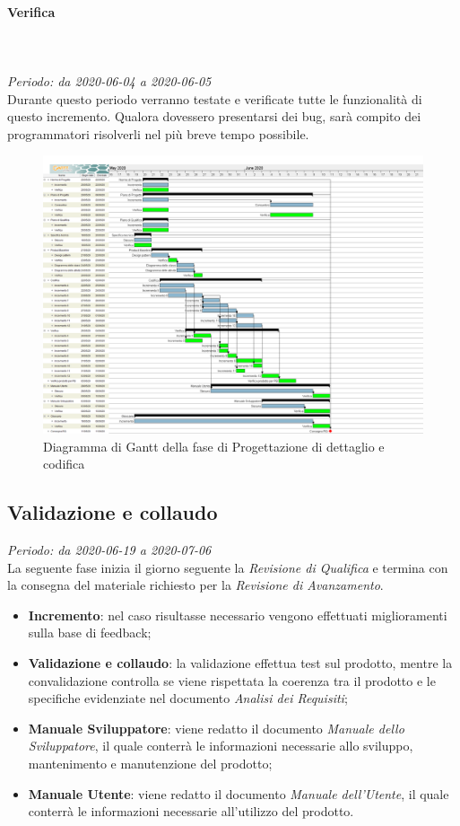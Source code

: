 \paragraph*{Verifica}\mbox{} \\ \mbox{} \\ 
\textit{Periodo: da 2020-06-04 a 2020-06-05}\\
Durante questo periodo verranno testate e verificate tutte le funzionalità di questo incremento. Qualora dovessero presentarsi dei bug, sarà compito dei programmatori risolverli nel più breve tempo possibile.

\begin{figure}[H]
\centering
\includegraphics[scale=0.24]{./img/gantt/progettazione_dettaglio_codifica.png}
\caption{Diagramma di Gantt della fase di Progettazione di dettaglio e codifica}
\end{figure}

\subsection{Validazione e collaudo}
\textit{Periodo: da 2020-06-19 a 2020-07-06}\\
La seguente fase inizia il giorno seguente la \textit{Revisione di Qualifica} e termina con la consegna del materiale richiesto per la \textit{Revisione di Avanzamento}.
\begin{itemize}
\item \textbf{Incremento}: nel caso risultasse necessario vengono effettuati miglioramenti sulla base di feedback;
\item \textbf{Validazione e collaudo}: la validazione effettua test sul prodotto, mentre la convalidazione controlla se viene rispettata la coerenza tra il prodotto e le specifiche evidenziate nel documento \textit{Analisi dei Requisiti};
\item \textbf{Manuale Sviluppatore}: viene redatto il documento \textit{Manuale dello Sviluppatore}, il quale conterrà le informazioni necessarie allo sviluppo, mantenimento e manutenzione del prodotto;
\item \textbf{Manuale Utente}: viene redatto il documento \textit{Manuale dell'Utente}, il quale conterrà le informazioni necessarie all'utilizzo del prodotto.
\end{itemize}


